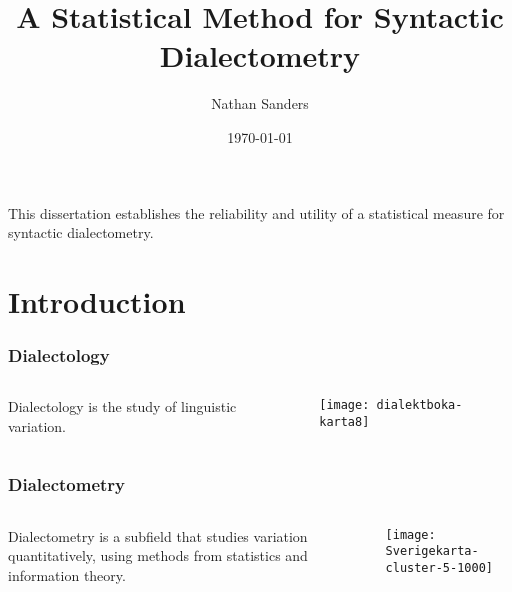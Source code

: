 \documentclass{beamer}
\title{A Statistical Method for Syntactic Dialectometry}
\author{Nathan Sanders}
\date{\today}
\begin{document}
\frame{\titlepage}

\section[Outline]{}
\frame{\tableofcontents}
\begin{frame}
  This dissertation establishes the reliability and utility of a
  statistical measure for syntactic dialectometry.
\end{frame}
\section{Introduction}
\begin{frame}
  \frametitle{Dialectology}
\begin{columns}
  \begin{definition}
    Dialectology is the study of linguistic variation.
  \end{definition}
  \texttt{[image: dialektboka-karta8]}
\end{columns}
\end{frame}
\begin{frame}
  \frametitle{Dialectometry}
\begin{columns}
 \begin{definition}
    Dialectometry is a subfield that studies variation quantitatively,
    using methods from statistics and information theory.
 \end{definition}
\texttt{[image: Sverigekarta-cluster-5-1000]}
\end{columns}
\end{frame}
\end{document}
